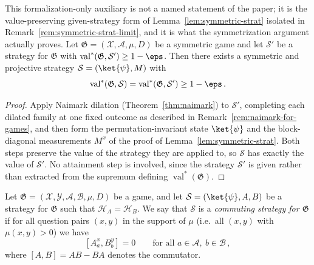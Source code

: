 \begin{lemma}
	\label{lem:symmetric-strat-given-strategy}
	\leanok
	This formalization-only auxiliary is not a named statement of the paper; it is the value-preserving given-strategy form of Lemma~\ref{lem:symmetric-strat} isolated in Remark~\ref{rem:symmetric-strat-limit}, and it is what the symmetrization argument actually proves. Let $\mathfrak G = (\mathcal X, \mathcal A, \mu, D)$ be a symmetric game and let $\mathcal S'$ be a strategy for $\mathfrak G$ with $\operatorname{val}^*(\mathfrak G, \mathcal S') \ge 1-\eps$. Then there exists a symmetric and projective strategy $\mathcal S = (\ket{\psi}, M)$ with
	\[
		\operatorname{val}^*(\mathfrak G, \mathcal S) = \operatorname{val}^*(\mathfrak G, \mathcal S') \ge 1-\eps\,.
	\]
\end{lemma}
\begin{proof}
	\leanok
	Apply Naimark dilation (Theorem~\ref{thm:naimark}) to $\mathcal S'$, completing each dilated family at one fixed outcome as described in Remark~\ref{rem:naimark-for-games}, and then form the permutation-invariant state $\ket{\psi}$ and the block-diagonal measurements $M^x$ of the proof of Lemma~\ref{lem:symmetric-strat}. Both steps preserve the value of the strategy they are applied to, so $\mathcal S$ has exactly the value of $\mathcal S'$. No attainment step is involved, since the strategy $\mathcal S'$ is given rather than extracted from the supremum defining $\operatorname{val}^*(\mathfrak G)$.
\end{proof}

\begin{definition}\label{def:comm-strategy}
	\leanok
	Let $\mathfrak G = (\mathcal X, \mathcal Y, \mathcal A, \mathcal B, \mu, D)$ be a game, and let $\mathcal S = (\ket{\psi}, A, B)$ be a strategy for $\mathfrak G$ such that $\mathcal H_A = \mathcal H_B$. We say that $\mathcal S$ is a \emph{commuting strategy for $\mathfrak G$} if for all question pairs $(x,y)$ in the support of $\mu$ (i.e.\ all $(x,y)$ with $\mu(x,y) > 0$) we have
	\[
		[A^x_a, B^y_b] = 0 \qquad \text{for all } a \in \mathcal A,\ b \in \mathcal B\,,
	\]
	where $[A,B] = AB - BA$ denotes the commutator.
\end{definition}

